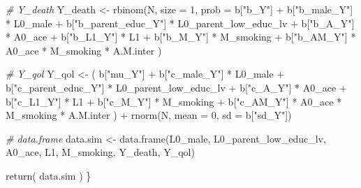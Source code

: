 \documentclass[
]{book}
\newenvironment{Shaded}{\begin{snugshade}}{\end{snugshade}}
\newcommand{\AttributeTok}[1]{\textcolor[rgb]{0.77,0.63,0.00}{#1}}
\newcommand{\CommentTok}[1]{\textcolor[rgb]{0.56,0.35,0.01}{\textit{#1}}}
\newcommand{\DecValTok}[1]{\textcolor[rgb]{0.00,0.00,0.81}{#1}}
\newcommand{\FunctionTok}[1]{\textcolor[rgb]{0.00,0.00,0.00}{#1}}
\newcommand{\NormalTok}[1]{#1}
\newcommand{\OtherTok}[1]{\textcolor[rgb]{0.56,0.35,0.01}{#1}}
\newcommand{\SpecialCharTok}[1]{\textcolor[rgb]{0.00,0.00,0.00}{#1}}
\newcommand{\StringTok}[1]{\textcolor[rgb]{0.31,0.60,0.02}{#1}}
\begin{document}
\begin{Shaded}
\begin{Highlighting}[]
  \CommentTok{\# Y\_death }
\NormalTok{  Y\_death }\OtherTok{\textless{}{-}} \FunctionTok{rbinom}\NormalTok{(N, }\AttributeTok{size =} \DecValTok{1}\NormalTok{, }\AttributeTok{prob =}\NormalTok{ b[}\StringTok{"b\_Y"}\NormalTok{] }\SpecialCharTok{+} 
\NormalTok{                      b[}\StringTok{"b\_male\_Y"}\NormalTok{] }\SpecialCharTok{*}\NormalTok{ L0\_male }\SpecialCharTok{+} 
\NormalTok{                      b[}\StringTok{"b\_parent\_educ\_Y"}\NormalTok{] }\SpecialCharTok{*}\NormalTok{ L0\_parent\_low\_educ\_lv }\SpecialCharTok{+} 
\NormalTok{                      b[}\StringTok{"b\_A\_Y"}\NormalTok{] }\SpecialCharTok{*}\NormalTok{ A0\_ace }\SpecialCharTok{+} 
\NormalTok{                      b[}\StringTok{"b\_L1\_Y"}\NormalTok{] }\SpecialCharTok{*}\NormalTok{ L1 }\SpecialCharTok{+}
\NormalTok{                      b[}\StringTok{"b\_M\_Y"}\NormalTok{] }\SpecialCharTok{*}\NormalTok{ M\_smoking }\SpecialCharTok{+}
\NormalTok{                      b[}\StringTok{"b\_AM\_Y"}\NormalTok{] }\SpecialCharTok{*}\NormalTok{ A0\_ace }\SpecialCharTok{*}\NormalTok{ M\_smoking }\SpecialCharTok{*}\NormalTok{ A.M.inter ) }
  
  \CommentTok{\# Y\_qol }
\NormalTok{  Y\_qol }\OtherTok{\textless{}{-}}\NormalTok{ ( b[}\StringTok{"mu\_Y"}\NormalTok{] }\SpecialCharTok{+} 
\NormalTok{               b[}\StringTok{"c\_male\_Y"}\NormalTok{] }\SpecialCharTok{*}\NormalTok{ L0\_male }\SpecialCharTok{+} 
\NormalTok{               b[}\StringTok{"c\_parent\_educ\_Y"}\NormalTok{] }\SpecialCharTok{*}\NormalTok{ L0\_parent\_low\_educ\_lv }\SpecialCharTok{+}
\NormalTok{               b[}\StringTok{"c\_A\_Y"}\NormalTok{] }\SpecialCharTok{*}\NormalTok{ A0\_ace }\SpecialCharTok{+}
\NormalTok{               b[}\StringTok{"c\_L1\_Y"}\NormalTok{] }\SpecialCharTok{*}\NormalTok{ L1 }\SpecialCharTok{+}
\NormalTok{               b[}\StringTok{"c\_M\_Y"}\NormalTok{] }\SpecialCharTok{*}\NormalTok{ M\_smoking }\SpecialCharTok{+} 
\NormalTok{               b[}\StringTok{"c\_AM\_Y"}\NormalTok{] }\SpecialCharTok{*}\NormalTok{ A0\_ace }\SpecialCharTok{*}\NormalTok{ M\_smoking }\SpecialCharTok{*}\NormalTok{ A.M.inter ) }\SpecialCharTok{+} 
    \FunctionTok{rnorm}\NormalTok{(N, }\AttributeTok{mean =} \DecValTok{0}\NormalTok{, }\AttributeTok{sd =}\NormalTok{ b[}\StringTok{"sd\_Y"}\NormalTok{])}
  
  \CommentTok{\# data.frame}
\NormalTok{  data.sim }\OtherTok{\textless{}{-}} \FunctionTok{data.frame}\NormalTok{(L0\_male, L0\_parent\_low\_educ\_lv, A0\_ace, L1, M\_smoking, }
\NormalTok{                         Y\_death, Y\_qol)}

  \FunctionTok{return}\NormalTok{( data.sim )}
\NormalTok{\}}
\end{Highlighting}
\end{Shaded}
\end{document}
